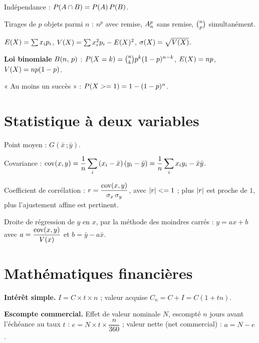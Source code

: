 \smallskip
\noindent
Indépendance : $\proba{A \cap B} = \proba{A}\proba{B}$.

\smallskip
\noindent
Tirages de $p$ objets parmi $n$ : $n^{p}$ avec remise, $\arrang{p}{n}$ sans
remise, $\combi{p}{n}$ simultanément.

\smallskip
\noindent
$\Esp(X) = \sum x_{i}p_{i}$, \quad
$\Var(X) = \sum x_{i}^{2}p_{i}-\Esp(X)^{2}$, \quad
$\ecart(X) = \sqrt{\Var(X)}$.

\smallskip
\noindent
\textbf{Loi binomiale} $\loibin{n}{p}$ :
$\proba{X = k} = \combi{k}{n}p^{k}(1-p)^{n-k}$, \quad
$\Esp(X) = np$, \quad $\Var(X) = np(1-p)$.

\smallskip
\noindent
« Au moins un succès » : $\proba{X \geq 1} = 1-(1-p)^{n}$.

\section*{Statistique à deux variables}

\noindent
Point moyen : $G\left(\bar x\,;\bar y\right)$.

\smallskip
\noindent
Covariance : $\displaystyle
\Cov(x,y) = \frac1n\sum_{i}\left(x_{i}-\bar x\right)\left(y_{i}-\bar y\right)
= \frac1n\sum_{i}x_{i}y_{i}-\bar x\bar y$.

\smallskip
\noindent
Coefficient de corrélation : $\displaystyle
r = \frac{\Cov(x,y)}{\sigma_{x}\,\sigma_{y}}$, avec $\abs r \leq 1$ ;
plus $\abs r$ est proche de $1$, plus l'ajustement affine est pertinent.

\smallskip
\noindent
Droite de régression de $y$ en $x$, par la méthode des moindres carrés :
$y = ax+b$ avec
$\displaystyle a = \frac{\Cov(x,y)}{\Var(x)}$ et $b = \bar y-a\bar x$.

\section*{Mathématiques financières}

\noindent
\textbf{Intérêt simple.} $I = C \times t \times n$ ; valeur acquise
$C_{n} = C+I = C(1+tn)$.

\smallskip
\noindent
\textbf{Escompte commercial.} Effet de valeur nominale $N$, escompté $n$
jours avant l'échéance au taux $t$ :
$e = N \times t \times \dfrac{n}{360}$ ; valeur nette (net commercial) :
$a = N-e$.


